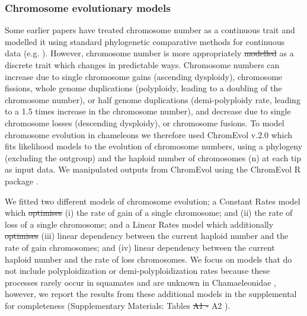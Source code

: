 \documentclass[a4paper, 12pt]{article}
\providecommand{\DIFadd}[1]{{\protect\color{blue}\uwave{#1}}} %
\providecommand{\DIFdel}[1]{{\protect\color{red}\sout{#1}}}                      %
\providecommand{\DIFaddbegin}{} %
\providecommand{\DIFaddend}{} %
\providecommand{\DIFdelbegin}{} %
\providecommand{\DIFdelend}{} %
\newcommand{\DIFscaledelfig}{0.5}
\newlength{\DIFdelgraphicswidth} %
\newlength{\DIFdelgraphicsheight} %
\newcommand{\DIFaddincludegraphics}[2][]{{\color{blue}\fbox{\DIFOincludegraphics[#1]{#2}}}} %
\newcommand{\DIFdelincludegraphics}[2][]{%
\sbox{\DIFdelgraphicsbox}{\DIFOincludegraphics[#1]{#2}}%
\settoboxwidth{\DIFdelgraphicswidth}{\DIFdelgraphicsbox} %
\settoboxtotalheight{\DIFdelgraphicsheight}{\DIFdelgraphicsbox} %
\scalebox{\DIFscaledelfig}{%
\parbox[b]{\DIFdelgraphicswidth}{\usebox{\DIFdelgraphicsbox}\\[-\baselineskip] \rule{\DIFdelgraphicswidth}{0em}}\llap{\resizebox{\DIFdelgraphicswidth}{\DIFdelgraphicsheight}{%
\setlength{\unitlength}{\DIFdelgraphicswidth}%
\begin{picture}(1,1)%
\thicklines\linethickness{2pt} %
{\color[rgb]{1,0,0}\put(0,0){\framebox(1,1){}}}%
{\color[rgb]{1,0,0}\put(0,0){\line( 1,1){1}}}%
{\color[rgb]{1,0,0}\put(0,1){\line(1,-1){1}}}%
\end{picture}%
}\hspace*{3pt}}} %
} %
\DeclareRobustCommand{\DIFaddbegin}{\DIFOaddbegin \let\includegraphics\DIFaddincludegraphics} %
\DeclareRobustCommand{\DIFaddend}{\DIFOaddend \let\includegraphics\DIFOincludegraphics} %
\DeclareRobustCommand{\DIFdelbegin}{\DIFOdelbegin \let\includegraphics\DIFdelincludegraphics} %
\DeclareRobustCommand{\DIFdelend}{\DIFOaddend \let\includegraphics\DIFOincludegraphics} %
\begin{document}
\subsubsection{Chromosome evolutionary models}
Some earlier papers have treated chromosome number as a continuous trait and modelled it using standard phylogenetic comparative methods for continuous data (e.g. \citealt{vershinina2017evolutionary}). 
However, chromosome number is more appropriately \DIFdelbegin \DIFdel{modelled }\DIFdelend \DIFaddbegin \DIFadd{modeled }\DIFaddend as a discrete trait which changes in predictable ways. 
Chromosome numbers can increase due to single chromosome gains (ascending dysploidy), chromosome fissions, whole genome duplications (polyploidy, leading to a doubling of the chromosome number), or half genome duplications (demi-polyploidy rate, leading to a 1.5 times increase in the chromosome number), and decrease due to single chromosome losses (descending dysploidy), or chromosome fusions. 
To model chromosome evolution in chameleons we therefore used ChromEvol v.2.0 \citep{glick2014chromevol,mayrose2010probabilistic} which fits likelihood models to the evolution of chromosome numbers, using a phylogeny (excluding the outgroup) and the haploid number of chromosomes (n) at each tip as input data. 
We manipulated outputs from ChromEvol using the ChromEvol R package \citep{chromevol}.

We fitted two different models of chromosome evolution; a Constant Rates model which \DIFdelbegin \DIFdel{optimises }\DIFdelend \DIFaddbegin \DIFadd{optimizes }\DIFaddend (i) the rate of gain of a single chromosome; and (ii) the rate of loss of a single chromosome; and a Linear Rates model which additionally \DIFdelbegin \DIFdel{optimises }\DIFdelend \DIFaddbegin \DIFadd{optimizes }\DIFaddend (iii) linear dependency between the current haploid number and the rate of gain chromosomes; and (iv) linear dependency between the current haploid number and the rate of loss chromosomes. 
We focus on models that do not include polyploidization or demi-polyploidization rates because these processes rarely occur in squamates and are unknown in Chamaeleonidae \citep{bogart1980evolutionary,mezzasalma2021lizards}, however, we report the results from these additional models in the supplemental for completeness (Supplementary Materials: Tables \DIFdelbegin \DIFdel{A1 - }\DIFdelend A2 \DIFaddbegin \DIFadd{and A3}\DIFaddend ). 
\end{document}
